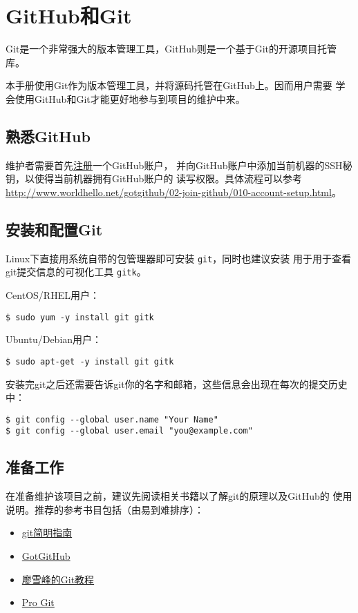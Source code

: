 \section{GitHub和Git}
Git是一个非常强大的版本管理工具，GitHub则是一个基于Git的开源项目托管库。

本手册使用Git作为版本管理工具，并将源码托管在GitHub上。因而用户需要
学会使用GitHub和Git才能更好地参与到项目的维护中来。

\subsection{熟悉GitHub}
维护者需要首先\href{https://github.com/join}{注册}一个GitHub账户，
并向GitHub账户中添加当前机器的SSH秘钥，以使得当前机器拥有GitHub账户的
读写权限。具体流程可以参考
\url{http://www.worldhello.net/gotgithub/02-join-github/010-account-setup.html}。

\subsection{安装和配置Git}
Linux下直接用系统自带的包管理器即可安装 \texttt{git}，同时也建议安装
用于用于查看git提交信息的可视化工具 \texttt{gitk}。

CentOS/RHEL用户：
\begin{verbatim}
$ sudo yum -y install git gitk
\end{verbatim}

Ubuntu/Debian用户：
\begin{verbatim}
$ sudo apt-get -y install git gitk
\end{verbatim}

安装完git之后还需要告诉git你的名字和邮箱，这些信息会出现在每次的提交历史中：
\begin{verbatim}
$ git config --global user.name "Your Name"
$ git config --global user.email "you@example.com"
\end{verbatim}

\subsection{准备工作}
在准备维护该项目之前，建议先阅读相关书籍以了解git的原理以及GitHub的
使用说明。推荐的参考书目包括（由易到难排序）：
\begin{itemize}
\item \href{http://rogerdudler.github.io/git-guide/index.zh.html}{git简明指南}
\item \href{http://www.worldhello.net/gotgithub/index.html}{GotGitHub}
\item \href{http://www.liaoxuefeng.com/wiki/0013739516305929606dd18361248578c67b8067c8c017b000}{廖雪峰的Git教程}
\item \href{https://git-scm.com/book/zh/v2}{Pro Git}
\end{itemize}

